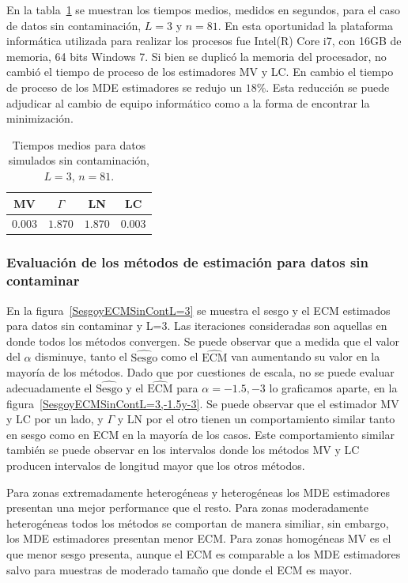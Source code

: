 En la tabla~\ref{tablaDeTiemposmediosMVyGAyLNyLC} se muestran los tiempos medios, medidos en segundos, para el caso de datos sin contaminación, $L=3$ y $n=81$. En esta oportunidad la plataforma informática utilizada para realizar los procesos fue Intel(R) Core i7, con 16GB de memoria, 64 bits Windows 7. Si bien se duplicó la memoria del procesador, no cambió el tiempo de proceso de los estimadores MV y LC. En cambio el tiempo de proceso de los MDE estimadores se redujo un $18\%$. Esta reducción se puede adjudicar al cambio de equipo informático como a la forma de encontrar la minimización.

\begin{table}[htb]
	\caption{\label{tablaDeTiemposmediosMVyGAyLNyLC}\small Tiempos medios para datos simulados sin contaminación, $L=3$, $n=81$. }
	\centering
	\begin{tabular}{cccc}
		\toprule
		MV& $\Gamma$ & LN & LC \\
		\midrule
		$0.003$& $1.870$ & $1.870$ &$0.003$ \\
		\bottomrule
	\end{tabular}
\end{table}

\subsubsection{Evaluación de los métodos de estimación para datos sin contaminar}

En la figura~\ref{SesgoyECMSinContL=3} se muestra el sesgo y el ECM estimados para datos sin contaminar y L=3. Las iteraciones consideradas son aquellas en donde todos los métodos convergen. Se puede observar que  a medida que el valor del $\alpha$ disminuye, tanto el $\widehat{\text{Sesgo}}$ como el $\widehat{\text{ECM}}$ van aumentando su valor en la mayoría de los métodos. Dado que por cuestiones de escala, no se puede evaluar adecuadamente el $\widehat{\text{Sesgo}}$ y el $\widehat{\text{ECM}}$ para $\alpha=-1.5, -3$ lo graficamos aparte, en la figura~\ref{SesgoyECMSinContL=3,-1.5y-3}. Se puede observar que el estimador MV y LC por un lado, y $\Gamma$ y LN por el otro tienen un comportamiento similar tanto en sesgo como en ECM en la mayoría de los casos. Este comportamiento similar también se puede observar en los intervalos donde los métodos MV y LC producen intervalos de longitud mayor que los otros métodos.

Para zonas extremadamente heterogéneas y heterogéneas los MDE estimadores presentan una mejor performance que el resto. Para zonas moderadamente heterogéneas todos los métodos se comportan de manera similiar, sin embargo, los MDE estimadores presentan menor ECM. Para zonas homogéneas MV es el que menor sesgo presenta, aunque el ECM es comparable a los MDE estimadores salvo para muestras de moderado tamaño que donde el ECM es mayor.


